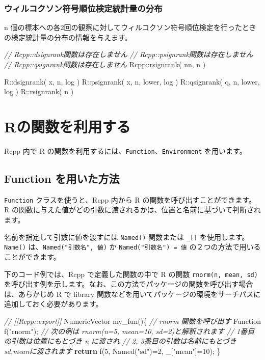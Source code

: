 \documentclass[]{book}
\newenvironment{Shaded}{\begin{snugshade}}{\end{snugshade}}
\newcommand{\CommentTok}[1]{\textcolor[rgb]{0.56,0.35,0.01}{\textit{#1}}}
\newcommand{\ControlFlowTok}[1]{\textcolor[rgb]{0.13,0.29,0.53}{\textbf{#1}}}
\newcommand{\DecValTok}[1]{\textcolor[rgb]{0.00,0.00,0.81}{#1}}
\newcommand{\NormalTok}[1]{#1}
\newcommand{\StringTok}[1]{\textcolor[rgb]{0.31,0.60,0.02}{#1}}
\begin{document}
\subsection{ウィルコクソン符号順位検定統計量の分布}

n 個の標本への各2回の観察に対してウィルコクソン符号順位検定を行ったときの検定統計量の分布の情報を与えます。

\begin{Shaded}
\begin{Highlighting}[]
\CommentTok{// Rcpp::dsignrank関数は存在しません}
\CommentTok{// Rcpp::psignrank関数は存在しません}
\CommentTok{// Rcpp::qsignrank関数は存在しません}
\NormalTok{Rcpp::rsignrank( nn, n )}

\NormalTok{R::dsignrank( x, n,        log )}
\NormalTok{R::psignrank( x, n, lower, log )}
\NormalTok{R::qsignrank( q, n, lower, log )}
\NormalTok{R::rsignrank(    n )}
\end{Highlighting}
\end{Shaded}

\hypertarget{r}{%
\chapter{Rの関数を利用する}\label{r}}

Rcpp 内で R の関数を利用するには、\texttt{Function}、\texttt{Environment} を用います。

\hypertarget{function-}{%
\section{Function を用いた方法}\label{function-}}

\texttt{Function} クラスを使うと、Rcpp 内から R の関数を呼び出すことができます。R の関数に与えた値がどの引数に渡されるかは、位置と名前に基づいて判断されます。

名前を指定して引数に値を渡すには \texttt{Named()} 関数または \texttt{\_{[}{]}} を使用します。\texttt{Name()} は、\texttt{Named("引数名",\ 値)} か \texttt{Named("引数名")\ =\ 値} の２つの方法で用いることができます。

下のコード例では、Rcpp で定義した関数の中で R の関数 \texttt{rnorm(n,\ mean,\ sd)} を呼び出す例を示します。なお、この方法でパッケージの関数を呼び出す場合は、あらかじめ R で library 関数などを用いてパッケージの環境をサーチパスに追加しておく必要があります。

\begin{Shaded}
\begin{Highlighting}[]
\CommentTok{// [[Rcpp::export]]}
\NormalTok{NumericVector my_fun()\{}
    \CommentTok{// rnorm 関数を呼び出す}
\NormalTok{    Function f(}\StringTok{"rnorm"}\NormalTok{);   }
    \CommentTok{// 次の例は rnorm(n=5, mean=10, sd=2)と解釈されます}
    \CommentTok{// 1番目の引数は位置にもとづき n に渡され}
    \CommentTok{// 2, 3番目の引数は名前にもとづきsd,meanに渡されます}
    \ControlFlowTok{return}\NormalTok{ f(}\DecValTok{5}\NormalTok{, Named(}\StringTok{"sd"}\NormalTok{)=}\DecValTok{2}\NormalTok{, _[}\StringTok{"mean"}\NormalTok{]=}\DecValTok{10}\NormalTok{);}
\NormalTok{\}}
\end{Highlighting}
\end{Shaded}
\end{document}
